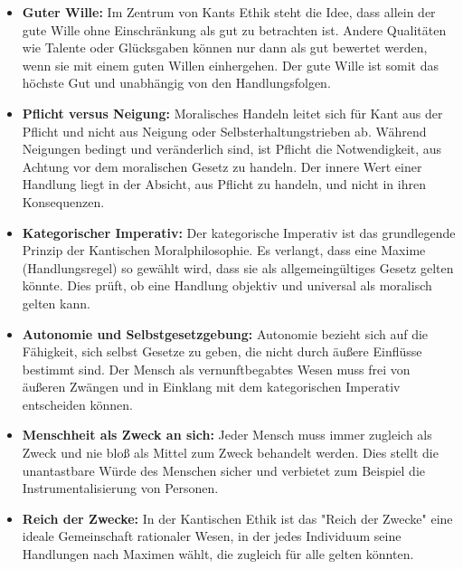 \documentclass{article}
\begin{document}
\begin{itemize}
	\item \textbf{Guter Wille:} Im Zentrum von Kants Ethik steht die Idee, dass allein der gute Wille ohne Einschränkung als gut zu betrachten ist. Andere Qualitäten wie Talente oder Glücksgaben können nur dann als gut bewertet werden, wenn sie mit einem guten Willen einhergehen. Der gute Wille ist somit das höchste Gut und unabhängig von den Handlungsfolgen.

	\item \textbf{Pflicht versus Neigung:} Moralisches Handeln leitet sich für Kant aus der Pflicht und nicht aus Neigung oder Selbsterhaltungstrieben ab. Während Neigungen bedingt und veränderlich sind, ist Pflicht die Notwendigkeit, aus Achtung vor dem moralischen Gesetz zu handeln. Der innere Wert einer Handlung liegt in der Absicht, aus Pflicht zu handeln, und nicht in ihren Konsequenzen.

	\item \textbf{Kategorischer Imperativ:} Der kategorische Imperativ ist das grundlegende Prinzip der Kantischen Moralphilosophie. Es verlangt, dass eine Maxime (Handlungsregel) so gewählt wird, dass sie als allgemeingültiges Gesetz gelten könnte. Dies prüft, ob eine Handlung objektiv und universal als moralisch gelten kann.

	\item \textbf{Autonomie und Selbstgesetzgebung:} Autonomie bezieht sich auf die Fähigkeit, sich selbst Gesetze zu geben, die nicht durch äußere Einflüsse bestimmt sind. Der Mensch als vernunftbegabtes Wesen muss frei von äußeren Zwängen und in Einklang mit dem kategorischen Imperativ entscheiden können.

	\item \textbf{Menschheit als Zweck an sich:} Jeder Mensch muss immer zugleich als Zweck und nie bloß als Mittel zum Zweck behandelt werden. Dies stellt die unantastbare Würde des Menschen sicher und verbietet zum Beispiel die Instrumentalisierung von Personen.

	\item \textbf{Reich der Zwecke:} In der Kantischen Ethik ist das "Reich der Zwecke" eine ideale Gemeinschaft rationaler Wesen, in der jedes Individuum seine Handlungen nach Maximen wählt, die zugleich für alle gelten könnten.
\end{itemize}
\end{document}
